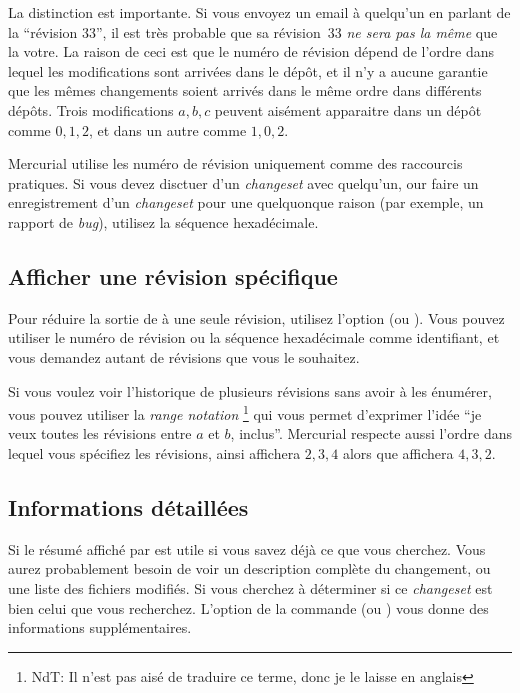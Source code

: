 La distinction est importante. Si vous envoyez un email à quelqu'un en
parlant de la ``révision 33'', il est très probable que sa révision~33
\emph{ne sera pas la même} que la votre. La raison de ceci est que le
numéro de révision dépend de l'ordre dans lequel les modifications sont
arrivées dans le dépôt, et il n'y a aucune garantie que les mêmes changements
soient arrivés dans le même ordre dans différents dépôts. Trois modifications
$a,b,c$ peuvent aisément apparaitre dans un dépôt comme $0,1,2$, et dans
un autre comme $1,0,2$.

Mercurial utilise les numéro de révision uniquement comme des raccourcis
pratiques. Si vous devez disctuer d'un \textit{changeset} avec quelqu'un, 
our faire un enregistrement d'un \textit{changeset} pour une quelquonque %
raison (par exemple, un rapport de \textit{bug}), utilisez la séquence
hexadécimale.

\subsection{Afficher une révision spécifique}

Pour réduire la sortie de  à une seule révision, utilisez
l'option  (ou ). Vous pouvez utiliser
le numéro de révision ou la séquence hexadécimale comme identifiant, et 
vous demandez autant de révisions que vous le souhaitez. 

Si vous voulez voir l'historique de plusieurs révisions sans avoir à 
les énumérer, vous pouvez utiliser la \emph{\textit{range notation}}
\footnote{NdT: Il n'est pas aisé de traduire ce terme, donc je le 
laisse en anglais} qui vous permet d'exprimer l'idée ``je veux toutes
les révisions entre $a$ et $b$, inclus''.
Mercurial respecte aussi l'ordre dans lequel vous spécifiez les 
révisions, ainsi  affichera $2,3,4$ alors que 
 affichera $4,3,2$.

\subsection{Informations détaillées}


Si le résumé affiché par  est utile si vous savez déjà ce %
que vous cherchez. Vous aurez probablement besoin de voir un description
complète du changement, ou une liste des fichiers modifiés. Si vous 
cherchez à déterminer si ce \textit{changeset} est bien celui que vous%
recherchez. L'option  de la commande  (ou 
) vous donne des informations supplémentaires.

